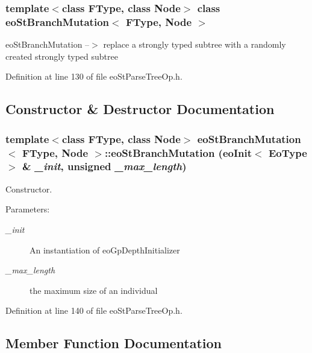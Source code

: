 \subsubsection*{template$<$class FType, class Node$>$ class eo\-St\-Branch\-Mutation$<$ FType, Node $>$}

eo\-St\-Branch\-Mutation --$>$ replace a strongly typed subtree with a randomly created strongly typed subtree 



Definition at line 130 of file eo\-St\-Parse\-Tree\-Op.h.

\subsection{Constructor \& Destructor Documentation}
\subsubsection{\setlength{\rightskip}{0pt plus 5cm}template$<$class FType, class Node$>$ {\bf eo\-St\-Branch\-Mutation}$<$ FType, Node $>$::{\bf eo\-St\-Branch\-Mutation} ({\bf eo\-Init}$<$ {\bf Eo\-Type} $>$ \& {\em \_\-init}, unsigned {\em \_\-max\_\-length})\hspace{0.3cm}{\tt  [inline]}}\label{classeo_st_branch_mutation_a0}


Constructor. 

\begin{Desc}
\item[Parameters:]
\begin{description}
\item[{\em \_\-init}]An instantiation of eo\-Gp\-Depth\-Initializer \item[{\em \_\-max\_\-length}]the maximum size of an individual \end{description}
\end{Desc}


Definition at line 140 of file eo\-St\-Parse\-Tree\-Op.h.

\subsection{Member Function Documentation}
